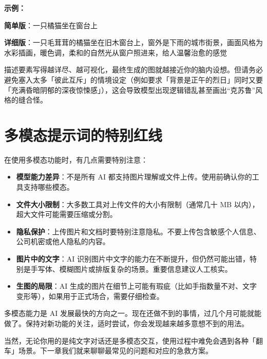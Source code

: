 \textbf{示例：}

\begin{promptbox}
\textbf{简单版}：一只橘猫坐在窗台上

\textbf{详细版}：一只毛茸茸的橘猫坐在旧木窗台上，窗外是下雨的城市街景，画面风格为水彩插画，暖色调，柔和的自然光从窗户照进来，给人温馨治愈的感觉
\end{promptbox}

\begin{tipbox}
描述要素写得越详尽、越可视化，最终生成的图就越接近你的脑内设想。但请务必避免塞入太多「彼此互斥」的情境设定（例如要求「背景是正午的烈日」同时又要「充满昏暗阴郁的深夜惊悚感」），这会导致模型出现逻辑错乱甚至画出“克苏鲁”风格的缝合怪。
\end{tipbox}

\section{多模态提示词的特别红线}

在使用多模态功能时，有几点需要特别注意：

\begin{itemize}
  \item \textbf{模型能力差异}：不是所有 AI 都支持图片理解或文件上传。使用前确认你的工具支持哪些模态。
  \item \textbf{文件大小限制}：大多数工具对上传文件的大小有限制（通常几十 MB 以内），超大文件可能需要压缩或分割。
  \item \textbf{隐私保护}：上传图片和文档时要特别注意隐私。不要上传包含敏感个人信息、公司机密或他人隐私的内容。
  \item \textbf{图片中的文字}：AI 识别图片中文字的能力在不断提升，但仍然可能出错，特别是手写体、模糊图片或排版复杂的场景。重要信息建议人工核实。
  \item \textbf{生图的局限}：AI 生成的图片在细节上可能有瑕疵（比如手指数量不对、文字变形等），如果用于正式场合，需要仔细检查。
\end{itemize}

多模态能力是 AI 发展最快的方向之一。现在还做不到的事情，过几个月可能就能做了。保持对新功能的关注，适时尝试，你会发现越来越多意想不到的用法。

当然，无论你用的是纯文字对话还是多模态交互，使用过程中难免会遇到各种「翻车」场景。下一章我们就来聊聊最常见的问题和对应的急救方案。
